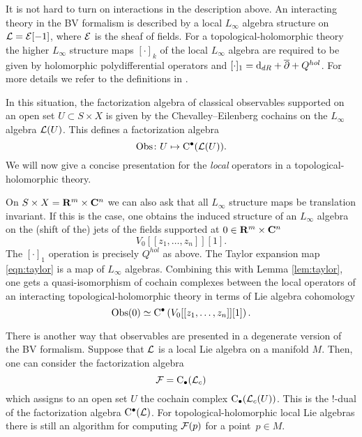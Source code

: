 \parsec[s:interaction]

It is not hard to turn on interactions in the description above. 
An interacting theory in the BV formalism is described by a local $L_\infty$ algebra structure on $\mathcal L = \mathcal E[-1]$, where $\mathcal E$ is the sheaf of fields.
For a topological-holomorphic theory the higher $L_\infty$ structure maps $[\cdot]_k$ of the local $L_\infty$ algebra are required to be given by holomorphic polydifferential operators and $[\cdot]_1 = {\rm d}_{dR} + \overline{\partial} + Q^{hol}$.  
For more details we refer to the definitions in \cite{GRWthf}.

In this situation, the factorization algebra of classical observables supported on an open set $U \subset S \times X$ is given by the Chevalley--Eilenberg cochains on the $L_\infty$ algebra $\mathcal L(U)$. 
This defines a factorization algebra 
\[
\operatorname{Obs} \colon U \mapsto {\rm C}^\bullet(\mathcal L(U)) .
\]
We will now give a concise presentation for the {\em local} operators in a topological-holomorphic theory. 

On $S \times X = \mathbf{R}^m \times \mathbf{C}^n$ we can also ask that all $L_\infty$ structure maps be translation invariant. 
If this is the case, one obtains the induced structure of an $L_\infty$ algebra on the (shift of the) jets of the fields supported at $0 \in \mathbf{R}^m \times \mathbf{C}^n$
\[
V_0 [[z_1,\ldots,z_n]] [1] .
\]
The $[\cdot]_1$ operation is precisely $Q^{hol}$ as above.
The Taylor expansion map \eqref{eqn:taylor} is a map of $L_\infty$ algebras. 
Combining this with Lemma \ref{lem:taylor}, one gets a quasi-isomorphism of cochain complexes between the local operators of an interacting topological-holomorphic theory in terms of Lie algebra cohomology
\[
\operatorname{Obs}(0) \simeq {\rm C}^\bullet\left(V_0[[z_1,\ldots,z_n]][1]\right) .
\]


\parsec[s:envelope]

There is another way that observables are presented in a degenerate version of the BV formalism. 
Suppose that $\mathcal L$ is a local Lie algebra on a manifold $M$. 
Then, one can consider the factorization algebra
\[
\mathcal F = {\rm C}_\bullet(\mathcal L_c)
\]
which assigns to an open set $U$ the cochain complex ${\rm C}_\bullet(\mathcal L_c(U))$.
This is the $!$-dual of the factorization algebra ${\rm C}^\bullet(\mathcal L)$.
For topological-holomorphic local Lie algebras there is still an algorithm for computing $\mathcal F(p)$ for a point~$p \in M$.

